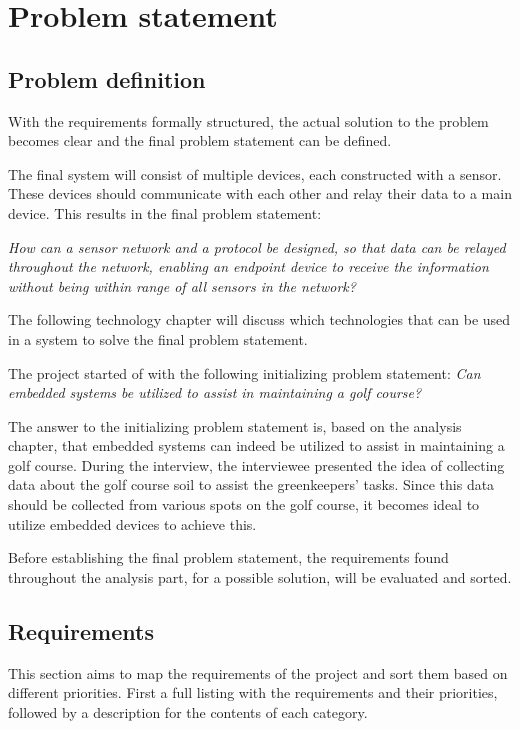 \chapter{Problem statement}

\section{Problem definition}
With the requirements formally structured, the actual solution to the problem becomes clear and the final problem statement can be defined.

The final system will consist of multiple devices, each constructed with a sensor. These devices should communicate with each other and relay their data to a main device. This results in the final problem statement:

\textit{How can a sensor network and a protocol be designed, so that data can be relayed throughout the network, enabling an endpoint device to receive the information without being within range of all sensors in the network?}

The following technology chapter will discuss which technologies that can be used in a system to solve the final problem statement.

The project started of with the following initializing problem statement:
\textit{Can embedded systems be utilized to assist in maintaining a golf course?}

The answer to the initializing problem statement is, based on the analysis chapter, that embedded systems can indeed be utilized to assist in maintaining a golf course. During the interview, the interviewee presented the idea of collecting data about the golf course soil to assist the greenkeepers' tasks. Since this data should be collected from various spots on the golf course, it becomes ideal to utilize embedded devices to achieve this.

Before establishing the final problem statement, the requirements found throughout the analysis part, for a possible solution, will be evaluated and sorted.

\section{Requirements}
This section aims to map the requirements of the project and sort them based on different priorities. First a full listing with the requirements and their priorities, followed by a description for the contents of each category.

